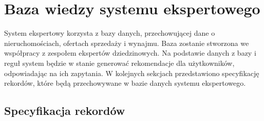 \section{Baza wiedzy systemu ekspertowego}

System ekspertowy korzysta z bazy danych, przechowującej dane o nieruchomościach, ofertach sprzedaży i wynajmu. Baza zostanie stworzona we współpracy z zespołem ekspertów dziedzinowych. Na podstawie danych z bazy i reguł system będzie w stanie generować rekomendacje dla użytkowników, odpowiadając na ich zapytania. W kolejnych sekcjach przedstawiono specyfikację rekordów, które będą przechowywane w bazie danych systemu ekspertowego.

\subsection{Specyfikacja rekordów}

